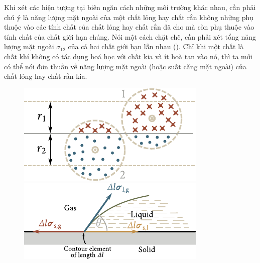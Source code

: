 
Khi xét các hiện tượng tại biên ngăn cách những môi trường khác nhau, cần phải chú ý là năng lượng mặt ngoài của một chất lỏng hay chất rắn không những phụ thuộc vào các tính chất của chất lỏng hay chất rắn đã cho mà còn phụ thuộc vào tính chất của chất giới hạn chúng. Nói một cách chặt chẽ, cần phải xét tổng năng lượng mặt ngoài $\sigma_{12}$ của cả hai chất giới hạn lẫn nhau (). Chỉ khi một chất là chất khí không có tác dụng hoá học với chất kia và ít hoà tan vào nó, thì ta mới có thể nói đơn thuần về năng lượng mặt ngoài (hoặc suất căng mặt ngoài) của chất lỏng hay chất rắn kia.

\begin{figure}[!htb]
	\begin{minipage}[t]{0.5\linewidth}
		\begin{center}
			\includegraphics[scale=1]{figures/ch_14/fig_14_6.pdf}
			\caption[]{}
			\label{fig:14_6}
		\end{center}
	\end{minipage}
	\hspace{-0.05cm}
	\begin{minipage}[t]{0.5\linewidth}
		\begin{center}
			\includegraphics[scale=1]{figures/ch_14/fig_14_7.pdf}
			\caption[]{}
			\label{fig:14_7}
		\end{center}
	\end{minipage}
	\vspace{-0.4cm}
\end{figure}

